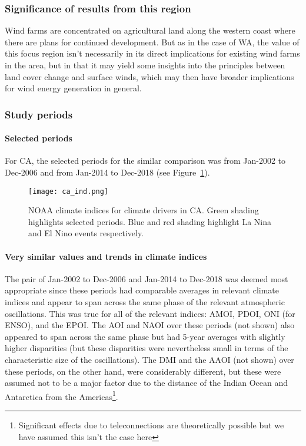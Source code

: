 \subsubsection{Significance of results from this region}

Wind farms are concentrated on agricultural land along the western coast where there are plans for continued development. But as in the case of \ac{WA}, the value of this focus region isn't necessarily in its direct implications for existing wind farms in the area, but in that it may yield some insights into the principles between land cover change and surface winds, which may then have broader implications for wind energy generation in general.

\subsubsection{Study periods}
\label{sssec:period_seas_ca}

\paragraph{Selected periods}

For \ac{CA}, the selected periods for the similar comparison was from Jan-2002 to Dec-2006 and from Jan-2014 to Dec-2018 (see Figure~\ref{fig:ca_ind}).

\begin{figure}[!htp]
	\centering
	\texttt{[image: ca\_ind.png]}
	\caption[CA's and SA's relevant climate indices for similar comparison]{\ac{NOAA} climate indices for climate drivers in \ac{CA}. Green shading highlights selected periods. Blue and red shading highlight La Nina and El Nino events respectively.}
	\label{fig:ca_ind}
\end{figure}

\paragraph{Very similar values and trends in climate indices}

The pair of Jan-2002 to Dec-2006 and Jan-2014 to Dec-2018 was deemed most appropriate since these periods had comparable averages in relevant climate indices and appear to span across the same phase of the relevant atmospheric oscillations. This was true for all of the relevant indices: \ac{AMOI}, \ac{PDOI}, \ac{ONI} (for \ac{ENSO}), and the \ac{EPOI}. The \ac{AOI} and \ac{NAOI} over these periods (not shown) also appeared to span across the same phase but had 5-year averages with slightly higher disparities (but these disparities were nevertheless small in terms of the characteristic size of the oscillations). The \ac{DMI} and the \ac{AAOI} (not shown) over these periods, on the other hand, were considerably different, but these were assumed not to be a major factor due to the distance of the Indian Ocean and Antarctica from the Americas\footnote{Significant effects due to teleconnections are theoretically possible but we have assumed this isn't the case here}.

